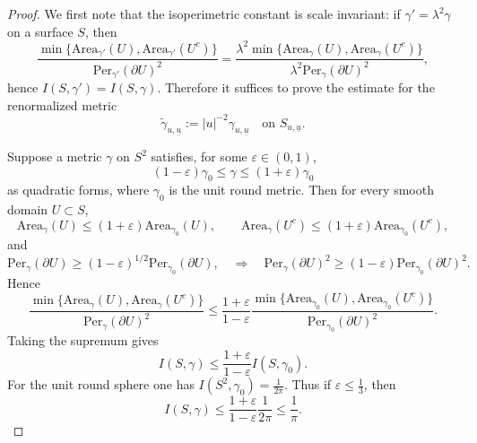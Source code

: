 \documentclass[10pt,a4paper]{amsart}
\newcommand{\ubar}{\underline{u}}
\begin{document}
\begin{proof}
We first note that the isoperimetric constant is scale invariant: if $\gamma'=\lambda^{2}\gamma$ on a surface $S$, then
\[
\frac{\min\{\text{Area}_{\gamma'}(U),\text{Area}_{\gamma'}(U^{c})\}}{\text{Per}_{\gamma'}(\partial U)^2}
=
\frac{\lambda^{2}\min\{\text{Area}_{\gamma}(U),\text{Area}_{\gamma}(U^{c})\}}{\lambda^{2}\text{Per}_{\gamma}(\partial U)^2},
\]
hence $I(S,\gamma')=I(S,\gamma)$. Therefore it suffices to prove the estimate for the renormalized metric
\[
\tilde\gamma_{u,\ubar}:=|u|^{-2}\gamma_{u,\ubar}
\quad\text{on }S_{u,\ubar}.
\]

\medskip
\noindent
Suppose a metric $\gamma$ on $S^2$ satisfies, for some $\varepsilon\in(0,1)$,
\begin{equation}\label{eq:bilip-proof}
(1-\varepsilon)\gamma_{0}\le \gamma \le (1+\varepsilon)\gamma_{0}
\end{equation}
as quadratic forms, where $\gamma_{0}$ is the unit round metric. Then for every smooth domain $U\subset S$,
\[
\text{Area}_{\gamma}(U)\le (1+\varepsilon)\text{Area}_{\gamma_{0}}(U), 
\qquad
\text{Area}_{\gamma}(U^{c})\le (1+\varepsilon)\text{Area}_{\gamma_{0}}(U^{c}),
\]
and
\[
\text{Per}_{\gamma}(\partial U)\ge (1-\varepsilon)^{1/2}\text{Per}_{\gamma_{0}}(\partial U),
\quad\Rightarrow\quad
\text{Per}_{\gamma}(\partial U)^2\ge (1-\varepsilon)\text{Per}_{\gamma_{0}}(\partial U)^2.
\]
Hence
\[
\frac{\min\{\text{Area}_{\gamma}(U),\text{Area}_{\gamma}(U^{c})\}}{\text{Per}_{\gamma}(\partial U)^2}
\le
\frac{1+\varepsilon}{1-\varepsilon}
\frac{\min\{\text{Area}_{\gamma_{0}}(U),\text{Area}_{\gamma_{0}}(U^{c})\}}{\text{Per}_{\gamma_{0}}(\partial U)^2}.
\]
Taking the supremum gives
\begin{equation}\label{eq:I-bilip-proof}
I(S,\gamma)\le \frac{1+\varepsilon}{1-\varepsilon} I(S,\gamma_{0}).
\end{equation}
For the unit round sphere one has $I(S^{2},\gamma_{0})=\frac{1}{2\pi}$. Thus if $\varepsilon\le \frac13$, then
\begin{equation}\label{eq:I-target-proof}
I(S,\gamma)\le \frac{1+\varepsilon}{1-\varepsilon}\frac{1}{2\pi}\le \frac{1}{\pi}.
\end{equation}


\end{proof}
\end{document}
